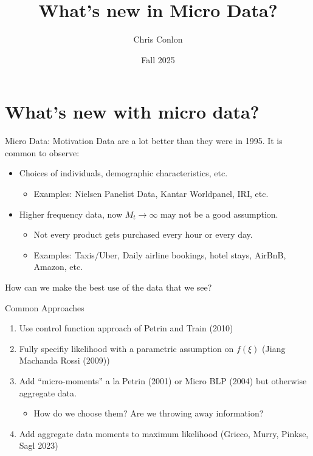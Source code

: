 \documentclass[aspectratio=169,10pt]{beamer}
\title{What's new in Micro Data?}
\author{Chris Conlon}
\institute{NYU Stern}
\date{Fall 2025}
\begin{document}
\begin{frame}
\titlepage
\end{frame}


\section*{What's new with micro data?}

\begin{frame}{Micro Data: Motivation}
Data are a lot better than they were in 1995. It is common to observe:
\begin{itemize}
\item Choices of individuals, demographic characteristics, etc.
\begin{itemize}
\item Examples: Nielsen Panelist Data, Kantar Worldpanel, IRI, etc.
\end{itemize}
\item Higher frequency data, now $M_t \rightarrow \infty$ may not be a good assumption.
\begin{itemize}
    \item Not every product gets purchased every hour or every day.
    \item Examples: Taxis/Uber, Daily airline bookings, hotel stays, AirBnB, Amazon, etc.
\end{itemize}
\end{itemize}
How can we make the best use of the data that we see?
\end{frame}


\begin{frame}{Common Approaches}
\begin{enumerate}
\item Use control function approach of Petrin and Train (2010)
\item Fully specifiy likelihood with a parametric assumption on $f(\xi)$ (Jiang Machanda Rossi (2009))
\item Add ``micro-moments'' a la Petrin (2001) or Micro BLP (2004) but otherwise aggregate data.
\begin{itemize}
\item How do we choose them? Are we throwing away information?
\end{itemize}
\item Add aggregate data moments to maximum likelihood (Grieco, Murry, Pinkse, Sagl 2023)
\end{enumerate}
\end{frame}
\end{document}
